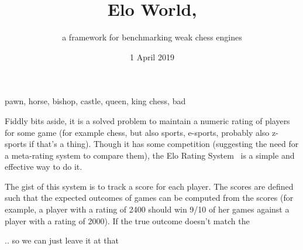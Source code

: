 \documentclass[numbers]{sigplanconf}
\begin{document}
 

\title{Elo World,}
\subtitle{a framework for benchmarking weak chess engines}


\terms
pawn, horse, bishop, castle, queen, king
\keywords
chess, bad


\newcommand\checkmate{\hspace{-.05em}\raisebox{.4ex}{\tiny\bf ++}}

\renewcommand\th{\ensuremath{{}^{\textrm{th}}}}
\newcommand\st{\ensuremath{{}^{\textrm{st}}}}
\newcommand\rd{\ensuremath{{}^{\textrm{rd}}}}
\newcommand\nd{\ensuremath{{}^{\textrm{nd}}}}
\newcommand\at{\ensuremath{\scriptstyle @}}

\date{1 April 2019}

\maketitle \thispagestyle{empty}

Fiddly bits aside, it is a solved problem to maintain a numeric rating
of players for some game (for example chess, but also sports,
e-sports, probably also z-sports if that's a thing). Though it has
some competition (suggesting the need for a meta-rating system to
compare them), the Elo Rating System~\cite{elo1978rating} is a simple
and effective way to do it.

The gist of this system is to track a score for each player. The
scores are defined such that the expected outcomes of games can
be computed from the scores (for example, a player with a rating
of 2400 should win 9/10 of her games against a player with a
rating of 2000). If the true outcome doesn't match the 

.. so we can just leave it at that


% 
\end{document}
